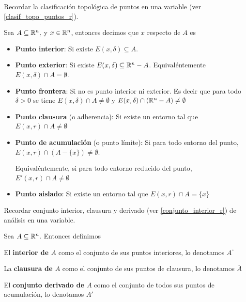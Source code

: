 Recordar la clasificación topológica de puntos en una variable (ver \ref{clasif_topo_puntos_r}).

\begin{definition}[Puntos]

Sea $A \subseteq \mathbb{R}^n$, y $x \in \mathbb{R}^n$, entonces decimos que $x$ respecto de $A$ es 

\begin{itemize}
\item \textbf{Punto interior}: Si existe $E(x,\delta) \subseteq A$.

\item \textbf{Punto exterior}: Si existe $E(x,\delta) \subseteq \mathbb{R}^n - A$.  Equivaléntemente $E(x,\delta) \cap A = \emptyset$.

\item \textbf{Punto frontera}: Si no es punto interior ni exterior.  Es decir que para todo $ \delta > 0$ se tiene $E(x,\delta) \cap A \neq \emptyset$ y $E(x,\delta) \cap (\mathbb{R}^n - A) \neq \emptyset$

\item \textbf{Punto clausura} (o adherencia): Si existe un entorno tal que $E(x,r) \cap A \neq \emptyset$

\item \textbf{Punto de acumulación} (o punto límite): Si para todo entorno del punto, $ E(x,r) \cap (A - \{x\}) \neq \emptyset$.

Equivaléntemente, si para todo entorno reducido del punto, $ E'(x,r) \cap A \neq \emptyset$

\item \textbf{Punto aislado}: Si existe un entorno tal que $E(x,r) \cap A = \{x\}$
\end{itemize}
\end{definition}

Recordar conjunto interior, clausura y derivado (ver \ref{conjunto_interior_r}) de análisis en una variable.

\begin{definition}[Interior]
Sea $A \subseteq \mathbb{R}^n$.  Entonces definimos

El \textbf{interior de $A$} como el conjunto de sus puntos interiores, lo denotamos $A^{\circ}$

La \textbf{clausura de $A$} como el conjunto de sus puntos de clausura, lo denotamos $\overline{A}$

El \textbf{conjunto derivado de $A$} como el conjunto de todos sus puntos de acumulación, lo denotamos $A'$
\end{definition}

